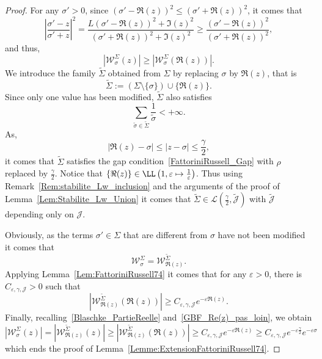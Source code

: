 \begin{proof}
For any $\sigma'>0$, since $(\sigma' - \Re(z))^2 \leq (\sigma' + \Re(z))^2$, it comes that
\[
\left| \frac{\sigma' - z}{\sigma'+z} \right|^2 = \frac{L(\sigma' -\Re(z))^2 + \Im(z)^2}{(\sigma' + \Re(z))^2 + \Im(z)^2} \geq \frac{(\sigma'-\Re(z))^2}{(\sigma' + \Re(z))^2},
\]
and thus,
\begin{equation}\label{Blaschke_PartieReelle}
\left| \mathcal{W}^{\Sigma}_{\sigma}(z) \right| \geq \left| \mathcal{W}^{\Sigma}_{\sigma}(\Re(z)) \right|.
\end{equation}
We introduce the family $\tilde{\Sigma}$ obtained from $\Sigma$ by replacing $\sigma$ by $\Re(z)$, that is
\[
\tilde{\Sigma} :=\left(\Sigma \setminus\{\sigma\}\right)\cup \{\Re(z) \}.
\]
Since only one value has been modified, $\tilde{\Sigma}$ also satisfies
\[
\sum_{\tilde{\sigma} \in \tilde{\Sigma}} \frac{1}{\tilde{\sigma}} < +\infty.
\]
As,
\begin{equation}\label{GBF_Re(z)_pas_loin}
|\Re(z) - \sigma| \leq |z - \sigma| \leq \frac{\gamma}{2},
\end{equation}
it comes that $\tilde{\Sigma}$ satisfies the gap condition~\eqref{FattoriniRussell_Gap} with $\rho$ replaced by $\frac{\gamma}{2}$. Notice that $\{\Re(z) \} \in \LL \left(1, \varepsilon \mapsto \frac{1}{\varepsilon} \right)$. Thus using Remark~\ref{Rem:stabilite_Lw_inclusion} and the arguments of the proof of Lemma~\ref{Lem:Stabilite_Lw_Union} it comes that $\tilde{\Sigma}\in \mathcal{L}\left(\frac{\gamma}{2},\tilde{\mathcal{J}}\right)$ with $\tilde{\mathcal{J}}$ depending only on $\mathcal{J}$.


Obviously, as the terms $\sigma'\in \Sigma$ that are different from $\sigma$ have not been modified it comes that
\[
\mathcal{W}^{\Sigma}_{\sigma} = \mathcal{W}^{\tilde{\Sigma}}_{\Re(z)}.
\]
Applying Lemma~\ref{Lem:FattoriniRussell74} it comes that for any $\varepsilon>0$, there is $C_{\varepsilon, \gamma, \mathcal{J}}>0$ such that
\[
\left|\mathcal{W}^{\tilde{\Sigma}}_{\Re(z)}(\Re(z)) \right| \geq C_{\varepsilon, \gamma, \mathcal{J}} e^{-\varepsilon \Re(z)}.
\]
Finally, recalling~\eqref{Blaschke_PartieReelle} and~\eqref{GBF_Re(z)_pas_loin}, we obtain
\[
\left|\mathcal{W}^{\Sigma}_{\sigma}(z) \right| = \left|\mathcal{W}^{\tilde{\Sigma}}_{\Re(z)}(z) \right| \geq \left|\mathcal{W}^{\tilde{\Sigma}}_{\Re(z)}(\Re(z)) \right|
\geq C_{\varepsilon, \gamma, \mathcal{J}} e^{-\varepsilon \Re(z)}
\geq C_{\varepsilon, \gamma, \mathcal{J}} e^{-\varepsilon \frac{\gamma}{2}} e^{-\varepsilon \sigma}
\]
which ends the proof of Lemma~\ref{Lemme:ExtensionFattoriniRussell74}.
\end{proof}


